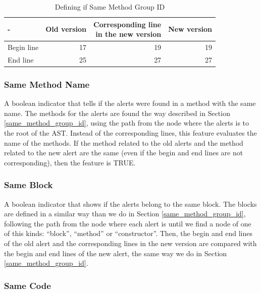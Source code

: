 \documentclass[
]{article}
\begin{document}
\normalsize

\small

\begin{table}[H]

\caption{\label{tab:unnamed-chunk-11}Defining if Same Method Group ID \label{tab_same_method_2}}
\centering
\begin{tabular}[t]{l|r|r|r}
\hline
- & Old version & \makecell[l]{Corresponding line\\in the new version} & New version\\
\hline
Begin line & 17 & 19 & 19\\
\hline
End line & 25 & 27 & 27\\
\hline
\end{tabular}
\end{table}

\normalsize

\subsubsection {Same Method Name}

A boolean indicator that tells if the alerts were found in a method with
the same name. The methods for the alerts are found the way described in
Section \ref{same_method_group_id}, using the path from the node where
the alerts is to the root of the AST. Instead of the corresponding
lines, this feature evaluates the name of the methods. If the method
related to the old alerts and the method related to the new alert are
the same (even if the begin and end lines are not corresponding), then
the feature is TRUE.

\subsubsection {Same Block}

A boolean indicator that shows if the alerts belong to the same block.
The blocks are defined in a similar way than we do in Section
\ref{same_method_group_id}, following the path from the node where each
alert is until we find a node of one of this kinds: ``block'',
``method'' or ``constructor''. Then, the begin and end lines of the old
alert and the corresponding lines in the new version are compared with
the begin and end lines of the new alert, the same way we do in Section
\ref{same_method_group_id}.

\subsubsection {Same Code}
\end{document}
